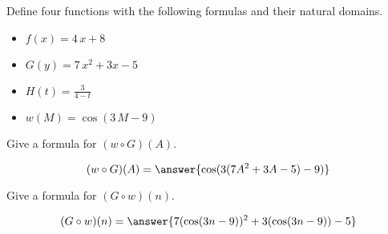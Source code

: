 \documentclass{ximera}
\author{Lee Wayand}
\begin{document}
\begin{exercise}




Define four functions with the following formulas and their natural domains. \\


\begin{itemize}
  \item $f(x) = 4 \, x + 8$
  \item $G(y) = 7 \, x^2 + 3 x - 5$
  \item $H(t) = \frac{3}{4 - t}$
  \item $w(M) = \cos(3 \, M - 9)$ 
\end{itemize}


\begin{question}


Give a formula for $(w \circ G)(A)$.

\[
(w \circ G)(A) = \answer{\cos(3(7A^2+3A-5)-9)}
\]

\end{question}






\begin{question}


Give a formula for $(G \circ w)(n)$.

\[
(G \circ w)(n) = \answer{7(\cos(3n-9))^2+3(\cos(3n-9))-5}
\]

\end{question}




\end{exercise}
\end{document}
